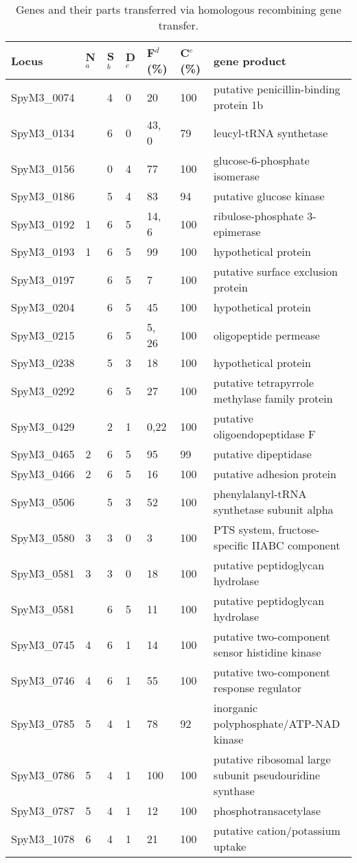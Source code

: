 \documentclass[10pt]{article}
\providecommand{\tabularnewline}{\\}
\begin{document}
\begin{table}
\caption{\label{tab:genes-transfer}Genes and their parts transferred via 
homologous
recombining gene transfer. }
{\footnotesize
\begin{tabular}{lllllll}
\hline 
Locus  & N$^a$  & S$^b$  & D$^c$ & F$^d$(\%)  & C$^e$(\%)  & gene 
product\tabularnewline
\hline 
SpyM3\_0074  &  & 4  & 0  & 20  & 100  & putative penicillin-binding protein 1b 
\tabularnewline
SpyM3\_0134  &  & 6  & 0  & 43, 0 & 79  & leucyl-tRNA synthetase \tabularnewline
SpyM3\_0156  &  & 0  & 4  & 77  & 100  & glucose-6-phosphate isomerase 
\tabularnewline
SpyM3\_0186  &  & 5  & 4  & 83  & 94  & putative glucose kinase \tabularnewline
SpyM3\_0192  & 1 & 6  & 5  & 14, 6 & 100  & ribulose-phosphate 3-epimerase 
\tabularnewline
SpyM3\_0193  & 1 & 6  & 5  & 99  & 100  & hypothetical protein\tabularnewline
SpyM3\_0197  &  & 6  & 5  & 7  & 100  & putative surface exclusion 
protein\tabularnewline
SpyM3\_0204  &  & 6  & 5  & 45  & 100  & hypothetical protein \tabularnewline
SpyM3\_0215  &  & 6  & 5  & 5, 26 & 100  & oligopeptide permease \tabularnewline
SpyM3\_0238  &  & 5  & 3  & 18  & 100  & hypothetical protein \tabularnewline
SpyM3\_0292  &  & 6  & 5  & 27  & 100  & putative tetrapyrrole methylase family 
protein \tabularnewline
SpyM3\_0429  &  & 2  & 1  & 0,22  & 100  & putative oligoendopeptidase 
F\tabularnewline
SpyM3\_0465  & 2 & 6  & 5  & 95  & 99  & putative dipeptidase \tabularnewline
SpyM3\_0466  & 2 & 6  & 5  & 16  & 100  & putative adhesion protein 
\tabularnewline
SpyM3\_0506  &  & 5  & 3  & 52  & 100  & phenylalanyl-tRNA synthetase subunit 
alpha \tabularnewline
SpyM3\_0580  & 3 & 3  & 0  & 3  & 100  & PTS system, fructose-specific IIABC 
component\tabularnewline
SpyM3\_0581  & 3 & 3  & 0  & 18  & 100  & putative peptidoglycan hydrolase 
\tabularnewline
SpyM3\_0581  &  & 6  & 5  & 11  & 100  & putative peptidoglycan hydrolase 
\tabularnewline
SpyM3\_0745  & 4 & 6  & 1  & 14  & 100  & putative two-component sensor 
histidine kinase \tabularnewline
SpyM3\_0746  & 4 & 6  & 1  & 55  & 100  & putative two-component response 
regulator \tabularnewline
SpyM3\_0785  & 5 & 4  & 1  & 78  & 92  & inorganic polyphosphate/ATP-NAD 
kinase\tabularnewline
SpyM3\_0786  & 5 & 4  & 1  & 100  & 100  & putative ribosomal large subunit 
pseudouridine synthase \tabularnewline
SpyM3\_0787  & 5 & 4  & 1  & 12  & 100  & phosphotransacetylase \tabularnewline
SpyM3\_1078  & 6 & 4  & 1  & 21  & 100  & putative cation/potassium uptake 

\end{tabular}}
\end{table}
\end{document}
